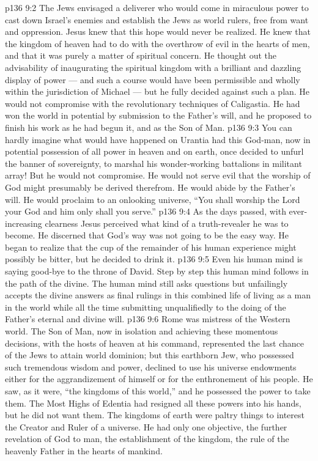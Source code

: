 \vs p136 9:2 The Jews envisaged a deliverer who would come in miraculous power to cast down Israel’s enemies and establish the Jews as world rulers, free from want and oppression. Jesus knew that this hope would never be realized. He knew that the kingdom of heaven had to do with the overthrow of evil in the hearts of men, and that it was purely a matter of spiritual concern. He thought out the advisability of inaugurating the spiritual kingdom with a brilliant and dazzling display of power --- and such a course would have been permissible and wholly within the jurisdiction of Michael --- but he fully decided against such a plan. He would not compromise with the revolutionary techniques of Caligastia. He had won the world in potential by submission to the Father’s will, and he proposed to finish his work as he had begun it, and as the Son of Man.
\vs p136 9:3 You can hardly imagine what would have happened on Urantia had this God\hyp{}man, now in potential possession of all power in heaven and on earth, once decided to unfurl the banner of sovereignty, to marshal his wonder\hyp{}working battalions in militant array! But he would not compromise. He would not serve evil that the worship of God might presumably be derived therefrom. He would abide by the Father’s will. He would proclaim to an onlooking universe, \textcolor{ubdarkred}{“You shall worship the Lord your God and him only shall you serve.”}
\vs p136 9:4 As the days passed, with ever\hyp{}increasing clearness Jesus perceived what kind of a truth\hyp{}revealer he was to become. He discerned that God’s way was not going to be the easy way. He began to realize that the cup of the remainder of his human experience might possibly be bitter, but he decided to drink it.
\vs p136 9:5 Even his human mind is saying good\hyp{}bye to the throne of David. Step by step this human mind follows in the path of the divine. The human mind still asks questions but unfailingly accepts the divine answers as final rulings in this combined life of living as a man in the world while all the time submitting unqualifiedly to the doing of the Father’s eternal and divine will.
\vs p136 9:6 Rome was mistress of the Western world. The Son of Man, now in isolation and achieving these momentous decisions, with the hosts of heaven at his command, represented the last chance of the Jews to attain world dominion; but this earthborn Jew, who possessed such tremendous wisdom and power, declined to use his universe endowments either for the aggrandizement of himself or for the enthronement of his people. He saw, as it were, “the kingdoms of this world,” and he possessed the power to take them. The Most Highs of Edentia had resigned all these powers into his hands, but he did not want them. The kingdoms of earth were paltry things to interest the Creator and Ruler of a universe. He had only one objective, the further revelation of God to man, the establishment of the kingdom, the rule of the heavenly Father in the hearts of mankind.
